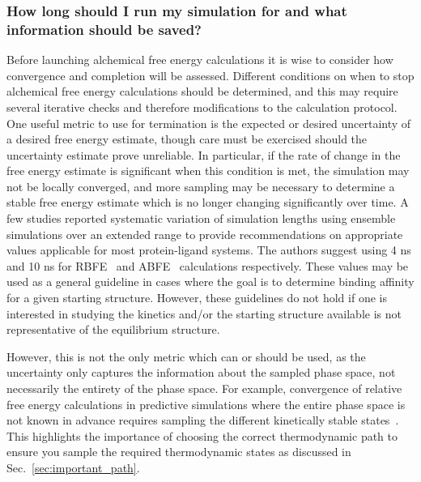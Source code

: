 \documentclass[9pt,bestpractices]{livecoms}
\begin{document}

\subsubsection{How long should I run my simulation for and what information should be saved?}
\label{sec:sim_length_information_kept}
Before launching alchemical free energy calculations it is wise to consider how convergence and completion will be assessed. Different conditions on when to stop alchemical free energy calculations should be determined, and this may require several iterative checks and therefore modifications to the calculation protocol.
One useful metric to use for termination is the expected or desired uncertainty of a desired free energy estimate, though care must be exercised should the uncertainty estimate prove unreliable.
In particular, if the rate of change in the free energy estimate is significant when this condition is met, the simulation may not be locally converged, and more sampling may be necessary to determine a stable free energy estimate which is no longer changing significantly over time. 
A few studies reported systematic variation of simulation lengths using ensemble simulations over an extended range to provide recommendations on appropriate values applicable for most protein-ligand systems. The authors suggest using 4 ns and 10 ns for RBFE~\cite{bhati2017, bhati2022, wan2023eqvsneq} and ABFE~\cite{bhati2025} calculations respectively. These values may be used as a general guideline in cases where the goal is to determine binding affinity for a given starting structure. However, these guidelines do not hold if one is interested in studying the kinetics and/or the starting structure available is not representative of the equilibrium structure.

However, this is not the only metric which can or should be used, as the uncertainty only captures the information about the sampled phase space, not necessarily the entirety of the phase space.  
For example, convergence of relative free energy calculations in predictive simulations where the entire phase space is not known in advance requires sampling the different kinetically stable states~\cite{mobley2012perspective}. 
This highlights the importance of choosing the correct thermodynamic path to ensure you sample the required thermodynamic states as discussed in Sec.~\ref{sec:important_path}.
\end{document}
